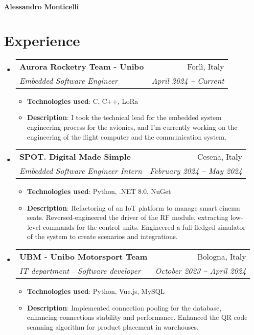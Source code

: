 \documentclass[letterpaper,11pt]{article}
\makeatletter
\newcommand{\resumeItem}[2]{
  \item\small{
    \textbf{#1}{: #2 \vspace{-2pt}}
  }
}
\newcommand{\resumeSubheading}[4]{
  \vspace{-1pt}\item
    \begin{tabular*}{0.97\textwidth}{l@{\extracolsep{\fill}}r}
      \textbf{#1} & #2 \\
      \textit{\small#3} & \textit{\small #4} \\
    \end{tabular*}\vspace{-5pt}
}
\newcommand{\resumeSubHeadingListStart}{\begin{itemize}[leftmargin=*]}
\newcommand{\resumeSubHeadingListEnd}{\end{itemize}}
\newcommand{\resumeItemListStart}{\begin{itemize}}
\newcommand{\resumeItemListEnd}{\end{itemize}\vspace{-5pt}}
\makeatother
\begin{document}
\setlength{\footskip}{5pt}
  \centering\textbf{\Large Alessandro Monticelli} \\
  \vspace{0.25in}

\section{Experience}
\resumeSubHeadingListStart
    \resumeSubheading{Aurora Rocketry Team - Unibo}{Forlì, Italy}{Embedded Software Engineer}{April 2024 -- Current}
    \resumeItemListStart
        \resumeItem{Technologies used} {C, C++, LoRa}
        \resumeItem{Description}
        {I took the technical lead for the embedded system engineering process for the avionics, and I'm currently working 
          on the engineering of the flight computer and the communication system.}
    \resumeItemListEnd
    \resumeSubheading{SPOT. Digital Made Simple}{Cesena, Italy}{Embedded Software Engineer Intern}{February 2024 -- May 2024}
    \resumeItemListStart
        \resumeItem{Technologies used} {Python, .NET 8.0, NuGet}
        \resumeItem{Description}
        {Refactoring of an IoT platform to manage smart cinema seats.
          Reversed-engineered the driver of the RF module, extracting low-level commands for the control units.
          Engineered a full-fledged simulator of the system to create scenarios and integrations.}
    \resumeItemListEnd
    \resumeSubheading{UBM - Unibo Motorsport Team}{Bologna, Italy}{IT department - Software developer}{October 2023 -- April 2024}
    \resumeItemListStart
        \resumeItem{Technologies used} {Python, Vue.js, MySQL}
        \resumeItem{Description}
        {Implemented connection pooling for the database, enhancing connections stability and performance. 
          Enhanced the QR code scanning algorithm for product placement in warehouses.}
    \resumeItemListEnd
\resumeSubHeadingListEnd
\end{document}
